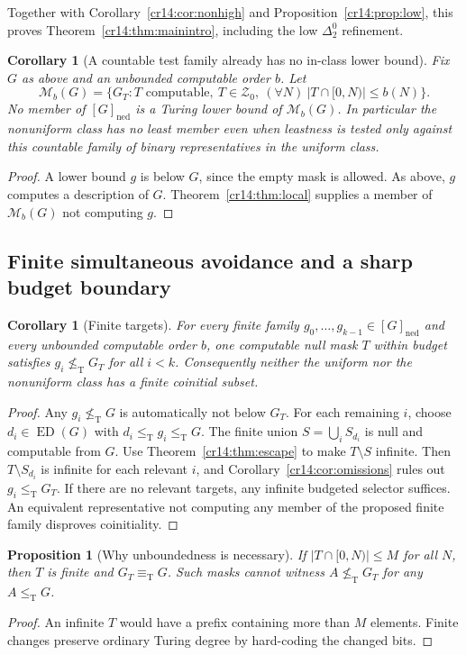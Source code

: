 \documentclass[11pt,a4paper]{article}
\newcommand{\leT}{\leq_{\mathrm T}}
\newcommand{\nleT}{\nleq_{\mathrm T}}
\newcommand{\eqT}{\equiv_{\mathrm T}}
\newcommand{\ned}{\mathrm{ned}}
\newcommand{\ED}{\operatorname{ED}}
\newcommand{\Znull}{\mathcal Z_0}
\newtheorem{proposition}[theorem]{Proposition}
\newtheorem{corollary}[theorem]{Corollary}
\theoremstyle{definition}
\theoremstyle{remark}
\begin{document}
Together with Corollary~\ref{cr14:cor:nonhigh} and
Proposition~\ref{cr14:prop:low}, this proves Theorem~\ref{cr14:thm:mainintro},
including the low $\Delta^0_2$ refinement.

\begin{corollary}[A countable test family already has no in-class lower bound]
\label{cr14:cor:testfamily}
Fix $G$ as above and an unbounded computable order $b$. Let
\[
 \mathcal M_b(G)=\{G_T:T\text{ computable},\ T\in\Znull,
                      \ (\forall N)\ |T\cap[0,N)|\leq b(N)\}.
\]
No member of $[G]_{\ned}$ is a Turing lower bound of
$\mathcal M_b(G)$. In particular the nonuniform class has no least member
even when leastness is tested only against this countable family of binary
representatives in the uniform class.
\end{corollary}
\begin{proof}
A lower bound $g$ is below $G$, since the empty mask is allowed. As above,
$g$ computes a description of $G$. Theorem~\ref{cr14:thm:local} supplies a
member of $\mathcal M_b(G)$ not computing $g$.
\end{proof}

\subsection{Finite simultaneous avoidance and a sharp budget boundary}
\begin{corollary}[Finite targets]\label{cr14:cor:finite}
For every finite family $g_0,\ldots,g_{k-1}\in[G]_{\ned}$ and every
unbounded computable order $b$, one computable null mask $T$ within budget
satisfies $g_i\nleT G_T$ for all $i<k$. Consequently neither the uniform
nor the nonuniform class has a finite coinitial subset.
\end{corollary}
\begin{proof}
Any $g_i\nleT G$ is automatically not below $G_T$. For each remaining
$i$, choose $d_i\in\ED(G)$ with $d_i\leT g_i\leT G$.
The finite union $S=\bigcup_i S_{d_i}$ is null and computable from $G$.
Use Theorem~\ref{cr14:thm:escape} to make $T\setminus S$ infinite. Then
$T\setminus S_{d_i}$ is infinite for each relevant $i$, and
Corollary~\ref{cr14:cor:omissions} rules out $g_i\leT G_T$.
If there are no relevant targets, any infinite budgeted selector suffices.
An equivalent representative not computing any member of the proposed
finite family disproves coinitiality.
\end{proof}

\begin{proposition}[Why unboundedness is necessary]\label{cr14:prop:bounded}
If $|T\cap[0,N)|\leq M$ for all $N$, then $T$ is finite and
$G_T\eqT G$. Such masks cannot witness $A\nleT G_T$ for any $A\leT G$.
\end{proposition}
\begin{proof}
An infinite $T$ would have a prefix containing more than $M$ elements.
Finite changes preserve ordinary Turing degree by hard-coding the changed
bits.
\end{proof}
\end{document}

